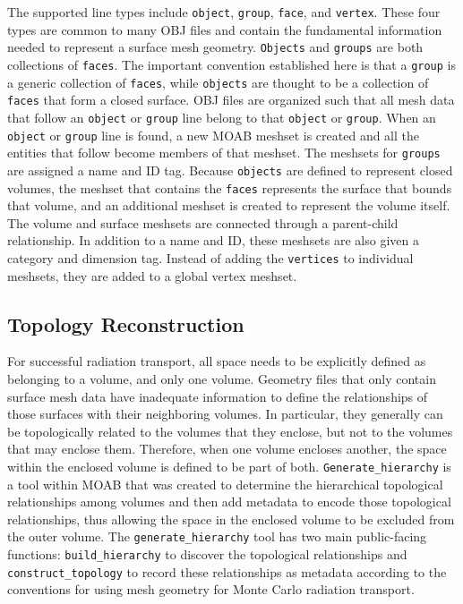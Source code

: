 \documentclass{anstrans}
\begin{document}
The supported line types include \texttt{object}, \texttt{group},
\texttt{face}, and \texttt{vertex}.  These four types are common to many OBJ
files and contain the fundamental information needed to represent a surface
mesh geometry.  \texttt{Objects} and \texttt{groups} are both collections of
\texttt{faces}.  The important convention established here is that a
\texttt{group} is a generic collection of \texttt{faces}, while
\texttt{objects} are thought to be a collection of \texttt{faces} that form a
closed surface.  OBJ files are organized such that all mesh data that follow
an \texttt{object} or \texttt{group} line belong to that \texttt{object} or
\texttt{group}.  When an \texttt{object} or \texttt{group} line is found, a
new MOAB meshset is created and all the entities that follow become members of
that meshset.  The meshsets for \texttt{groups} are assigned a name and
ID tag.  Because \texttt{objects} are defined to represent closed volumes, the
meshset that contains the \texttt{faces} represents the surface that bounds
that volume, and an additional meshset is created to represent the volume
itself.  The volume and surface meshsets are connected through a parent-child
relationship.  In addition to a name and ID, these meshsets are also given a
category and dimension tag.  Instead of adding the \texttt{vertices} to individual
meshsets, they are added to a global vertex meshset.

\subsection{Topology Reconstruction}
For successful radiation transport, all space needs to be explicitly defined
as belonging to a volume, and only one volume.  Geometry files that only
contain surface mesh data have inadequate information to define the
relationships of those surfaces with their neighboring volumes.  In
particular, they generally can be topologically related to the volumes that
they enclose, but not to the volumes that may enclose them.  Therefore, when
one volume encloses another, the space within the enclosed volume is defined
to be part of both. \texttt{Generate\_hierarchy} is a tool within MOAB
\cite{genhi} that was created to determine the hierarchical topological
relationships among volumes and then add metadata to encode those topological
relationships, thus allowing the space in the enclosed volume to be excluded
from the outer volume.  The \texttt{generate\_hierarchy} tool has two main
public-facing functions: \texttt{build\_hierarchy} to discover the topological
relationships and \texttt{construct\_topology} to record these relationships as
metadata according to the conventions for using mesh geometry for Monte
Carlo radiation transport.
\end{document}
